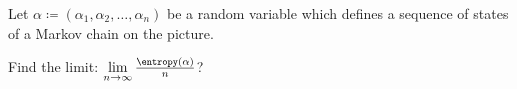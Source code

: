 Let $\alpha \coloneqq (\alpha_1, \alpha_2, \dots, \alpha_n)$ be a random variable which defines a
sequence of states of a Markov chain on the picture.

Find the limit: $\lim\limits_{n \to \infty} \frac{\entropy(\alpha)}{n}$?
